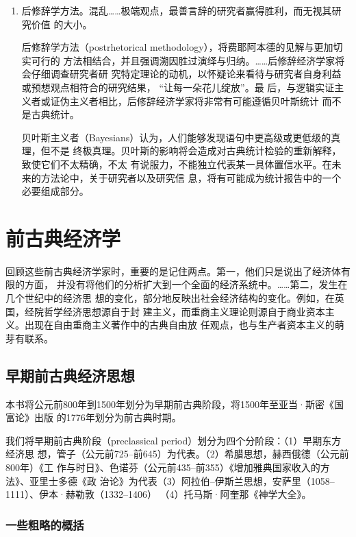 \begin{enumerate}
\item 后修辞学方法。混乱……极端观点，最善言辞的研究者赢得胜利，而无视其研究价值
  的大小。

  后修辞学方法（postrhetorical methodology），将费耶阿本德的见解与更加切实可行的
  方法相结合，并且强调溯因胜过演绎与归纳。……后修辞经济学家将会仔细调查研究者研
  究特定理论的动机，以怀疑论来看待与研究者自身利益或预想观点相符合的研究结果，
  “让每一朵花儿绽放”。最
  后，与逻辑实证主义者或证伪主义者相比，后修辞经济学家将非常有可能遵循贝叶斯统计
  而不是古典统计。

  贝叶斯主义者（Bayesians）认为，人们能够发现语句中更高级或更低级的真理，但不是
  终极真理。贝叶斯的影响将会造成对古典统计检验的重新解释，致使它们不太精确，不太
  有说服力，不能独立代表某一具体置信水平。在未来的方法论中，关于研究者以及研究信
  息，将有可能成为统计报告中的一个必要组成部分。

\end{enumerate}

\part{前古典经济学}

回顾这些前古典经济学家时，重要的是记住两点。第一，他们只是说出了经济体有限的方面，
并没有将他们的分析扩大到一个全面的经济系统中。……第二，发生在几个世纪中的经济思
想的变化，部分地反映出社会经济结构的变化。例如，在英国，经院哲学经济思想源自于封
建主义，而重商主义理论则源自于商业资本主义。出现在自由重商主义著作中的古典自由放
任观点，也与生产者资本主义的萌芽有联系。

\chapter{早期前古典经济思想}

本书将公元前800年到1500年划分为早期前古典阶段，将1500年至亚当·斯密《国富论》出版
的1776年划分为前古典时期。

我们将早期前古典阶段（preclassical period）划分为四个分阶段：（1）早期东方经济思
想，管子（公元前725--前645）为代表。（2）希腊思想，赫西俄德（公元前800年）《工
作与时日》、色诺芬（公元前435--前355）《增加雅典国家收入的方法》、亚里士多德《政
治论》为代表（3）阿拉伯--伊斯兰思想，安萨里（1058--1111）、伊本·赫勒敦（1332--1406）
（4）托马斯·阿奎那《神学大全》。

\section{一些粗略的概括}

